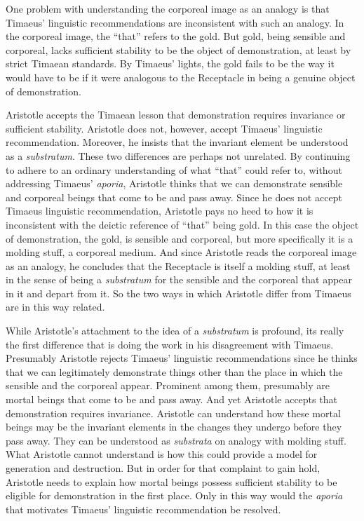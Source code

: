 
One problem with understanding the corporeal image as an analogy is that Timaeus' linguistic recommendations are inconsistent with such an analogy. In the corporeal image, the ``that'' refers to the gold. But gold, being sensible and corporeal, lacks sufficient stability to be the object of demonstration, at least by strict Timaean standards. By Timaeus' lights, the gold fails to be the way it would have to be if it were analogous to the Receptacle in being a genuine object of demonstration.

Aristotle accepts the Timaean lesson that demonstration requires invariance or sufficient stability. Aristotle does not, however, accept Timaeus' linguistic recommendation. Moreover, he insists that the invariant element be understood as a \emph{substratum}. These two differences are perhaps not unrelated. By continuing to adhere to an ordinary understanding of what ``that'' could refer to, without addressing Timaeus' \emph{aporia}, Aristotle thinks that we can demonstrate sensible and corporeal beings that come to be and pass away. Since he does not accept Timaeus linguistic recommendation, Aristotle pays no heed to how it is inconsistent with the deictic reference of ``that'' being gold. In this case the object of demonstration, the gold, is sensible and corporeal, but more specifically it is a molding stuff, a corporeal medium. And since Aristotle reads the corporeal image as an analogy, he concludes that the Receptacle is itself a molding stuff, at least in the sense of being a \emph{substratum} for the sensible and the corporeal that appear in it and depart from it. So the two ways in which Aristotle differ from Timaeus are in this way related.

While Aristotle's attachment to the idea of a \emph{substratum} is profound, its really the first difference that is doing the work in his disagreement with Timaeus. Presumably Aristotle rejects Timaeus' linguistic recommendations since he thinks that we can legitimately demonstrate things other than the place in which the sensible and the corporeal appear. Prominent among them, presumably are mortal beings that come to be and pass away. And yet Aristotle accepts that demonstration requires invariance. Aristotle can understand how these mortal beings may be the invariant elements in the changes they undergo before they pass away. They can be understood as \emph{substrata} on analogy with molding stuff. What Aristotle cannot understand is how this could provide a model for generation and destruction. But in order for that complaint to gain hold, Aristotle needs to explain how mortal beings possess sufficient stability to be eligible for demonstration in the first place. Only in this way would the \emph{aporia} that motivates Timaeus' linguistic recommendation be resolved. 

